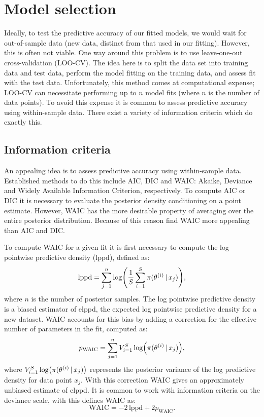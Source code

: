 \section{Model selection}
\label{sec:model_comparison}

Ideally, to test the predictive accuracy of our fitted models, we would wait for
out-of-sample data (new data, distinct from that used in our fitting).  However, this is
often not viable. One way around this problem is to use leave-one-out cross-validation
(LOO-CV). The idea here is to split the data set into training data and test data, perform
the model fitting on the training data, and assess fit with the test data.  Unfortunately,
this method comes at computational expense; LOO-CV can necessitate performing up to $n$
model fits (where $n$ is the number of data points). To avoid this expense it is common to
assess predictive accuracy using within-sample data. There exist a variety of information
criteria which do exactly this.

\subsection{Information criteria}

An appealing idea is to assess predictive accuracy using within-sample data. Established
methods to do this include AIC, DIC and WAIC: Akaike, Deviance and Widely Available
Information Criterion, respectively. To compute AIC or DIC it is necessary to evaluate the
posterior density conditioning on a point estimate. However, WAIC has the more desirable
property of averaging over the entire posterior distribution. Because of this reason
\textcite{gelman13} find WAIC more appealing than AIC and DIC.

To compute WAIC for a given fit it is first necessary to compute the log pointwise
predictive density (lppd), defined as:
\begin{equation*}
  \text{lppd} = \sum_{j=1}^n \log(\frac{1}{S} \sum_{i=1}^S \pi(\theta^{(i)} \,|\, x_j)),
\end{equation*}
where $n$ is the number of posterior samples. The log pointwise predictive density is a
biased estimator of elppd, the expected log pointwise predictive density for a new
dataset.  WAIC accounts for this bias by adding a correction for the effective number of
parameters in the fit, computed as:
\begin{equation*}
    p_{\text{WAIC}} = \sum_{j=1}^n V_{i=1}^{S}\log(\pi(\theta^{(i)} \,|\, x_j)),
\end{equation*}
where $V_{i=1}^{S}\log(\pi(\theta^{(i)} \,|\, x_j))$ represents the posterior variance of
the log predictive density for data point $x_j$. With this correction WAIC gives an
approximately unbiased estimate of elppd. It is common to work with information criteria
on the deviance scale, with this \textcite{watanabe09} defines WAIC as:
\begin{equation*}
    \text{WAIC} = -2\,\text{lppd} +2p_{\text{WAIC}}.
\end{equation*}

